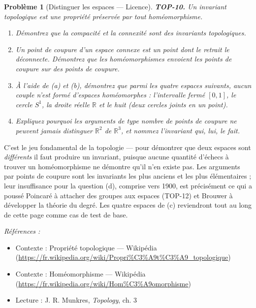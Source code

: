 \documentclass[11pt]{article}
\newtheorem{problem}{Problème}
\newenvironment{refs}{\par\small\noindent\emph{Références :}\begin{itemize}\setlength\itemsep{0pt}}{\end{itemize}\normalsize}
\begin{document}
\bigskip

\begin{problem}[{Distinguer les espaces --- Licence}]
\textbf{TOP-10.} Un \textit{invariant topologique} est une propriété préservée par tout
homéomorphisme.
\begin{enumerate}
\item[(a)] Démontrez que la compacité et la connexité sont des invariants topologiques.
\item[(b)] Un \textit{point de coupure} d'un espace connexe est un point dont le retrait le déconnecte.
Démontrez que les homéomorphismes envoient les points de coupure sur des points de coupure.
\item[(c)] À l'aide de (a) et (b), démontrez que parmi les quatre espaces suivants, aucun couple n'est formé
d'espaces homéomorphes : l'intervalle fermé $ [0,1] $, le cercle $ S^1 $, la droite réelle $\mathbb{R}$ et le
huit (deux cercles joints en un point).
\item[(d)] Expliquez pourquoi les arguments de type \og{} nombre de points de coupure \fg{} ne peuvent jamais
distinguer $ \mathbb{R}^2 $ de $ \mathbb{R}^3 $, et nommez l'invariant qui, lui, le fait.
\end{enumerate}

\end{problem}

\noindent C'est le jeu fondamental de la topologie --- pour démontrer que deux espaces sont
\textit{différents} il faut produire un invariant, puisque aucune quantité d'échecs à trouver un
homéomorphisme ne démontre qu'il n'en existe pas. Les arguments par points de coupure sont les invariants
les plus anciens et les plus élémentaires ; leur insuffisance pour la question (d), comprise vers 1900,
est précisément ce qui a poussé Poincaré à attacher des groupes aux espaces (TOP-12) et Brouwer à
développer la théorie du degré. Les quatre espaces de (c) reviendront tout au long de cette page comme cas
de test de base.

\begin{refs}
\item Contexte : Propriété topologique --- Wikipédia (\url{https://fr.wikipedia.org/wiki/Propri%C3%A9t%C3%A9_topologique})
\item Contexte : Homéomorphisme --- Wikipédia (\url{https://fr.wikipedia.org/wiki/Hom%C3%A9omorphisme})
\item Lecture : J. R. Munkres, \textit{Topology}, ch. 3
\end{refs}
\end{document}
